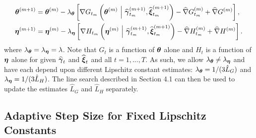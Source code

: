 \begin{align}
    \boldsymbol{\theta}^{(m+1)} &= \boldsymbol{\theta}^{(m)} - \lambda_{\boldsymbol{\theta}} \left[\nabla G_{t_m}\left(\boldsymbol{\theta}^{(m)} ~ \Big | ~ \widehat {\boldsymbol{\gamma}}_{t_m}^{(m+1)}, \widehat {\boldsymbol{\xi}}_{t_m}^{(m+1)}\right) - \widehat \nabla G_{t_m}^{(m)} + \widehat \nabla G^{(m)} \right], \\
    \boldsymbol{\eta}^{(m+1)} &= \boldsymbol{\eta}^{(m)} - \lambda_{\boldsymbol{\eta}} \left[\nabla H_{t_m}\left(\boldsymbol{\eta}^{(m)} ~ \Big | ~ \widehat {\boldsymbol{\gamma}}_{t_m}^{(m+1)}, \widehat {\boldsymbol{\xi}}_{t_m}^{(m+1)}\right) - \widehat \nabla H_{t_m}^{(m)} + \widehat \nabla H^{(m)} \right].
\end{align}
%
where $\lambda_{\boldsymbol{\theta}} = \lambda_{\boldsymbol{\eta}} = \lambda$. Note that $G_t$ is a function of $\boldsymbol{\theta}$ alone and $H_t$ is a function of $\boldsymbol{\eta}$ alone for given $\widehat {\boldsymbol{\gamma}}_{t}$ and $\widehat {\boldsymbol{\xi}}_{t}$ and all $t = 1,\ldots,T$. As such, we allow $\lambda_{\boldsymbol{\theta}} \neq \lambda_{\boldsymbol{\eta}}$ and have each depend upon different Lipschitz constant estimates: $\lambda_{\boldsymbol{\theta}} = 1/(3\hat L_G)$ and $\lambda_{\boldsymbol{\eta}} = 1/(3\hat L_H)$. The line search described in Section 4.1 can then be used to update the estimates $\hat L_G$ and $\hat L_H$ separately.

\subsection{Adaptive Step Size for Fixed Lipschitz Constants}
\label{subsec:L_divider}

